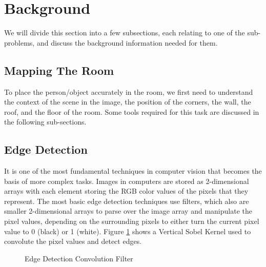 \section{Background}

We will divide this section into a few subsections, each relating to one of the sub-problems, and discuss the background information needed for them.

\subsection{Mapping The Room}

To place the person/object accurately in the room, we first need to understand the context of the scene in the image, the position of the corners, the wall, the roof, and the floor of the room. Some tools required for this task are discussed in the following sub-sections.

\subsection{Edge Detection}

It is one of the most fundamental techniques in computer vision that becomes the basis of more complex tasks. Images in computers are stored as 2-dimensional arrays with each element storing the RGB color values of the pixels that they represent. The most basic edge detection techniques use filters, which also are smaller 2-dimensional arrays to parse over the image array and manipulate the pixel values, depending on the surrounding pixels to either turn the current pixel value to 0 (black) or 1 (white). Figure \ref{fig:Edge Detection Convolution Filter} shows a Vertical Sobel Kernel used to convolute the pixel values and detect edges.\newline


\begin{figure}[H]
    \centering
    \caption{Edge Detection Convolution Filter}
    \label{fig:Edge Detection Convolution Filter}
\end{figure}




